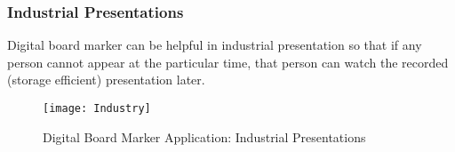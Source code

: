 \bigskip

\subsubsection{Industrial Presentations}
Digital board marker can be helpful in industrial presentation so that if any person cannot appear at the particular time, that person can watch the recorded (storage efficient) presentation later.

\bigskip

\begin{figure}[h]
  \centering
  \texttt{[image: Industry]}
  \caption{Digital Board Marker Application: Industrial Presentations}
\end{figure}

\bigskip













